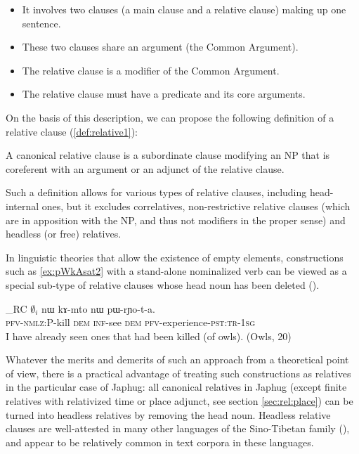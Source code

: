 \documentclass[oldfontcommands,oneside,a4paper,11pt]{article}
\newcommand{\ipa}[1]{{\phon #1}} %
\newcommand{\topic}{\textsc{dem}}
\begin{document}
\begin{itemize}
\item It involves two clauses (a main clause and a relative clause) making up one sentence. 
\item These two clauses share an argument (the Common Argument). 
\item The relative clause is a modifier of the Common Argument. 
\item The relative clause must have a predicate and its core arguments. 
\end{itemize}

On the basis of this description, we can propose  the following definition of a relative clause (\ref{def:relative1}):

\begin{exe}
\ex \label{def:relative1}
\glt A canonical relative clause is  a subordinate clause modifying an NP    that is coreferent with an argument or an adjunct of the relative clause. 
\end{exe}
 
Such a definition allows for various types of relative clauses, including head-internal ones, but it excludes correlatives, non-restrictive relative clauses (which are in apposition with the NP, and thus not modifiers in the proper sense) and headless (or free) relatives.

In linguistic theories that  allow the existence of empty elements, constructions such as \ref{ex:pWkAsat2} with a stand-alone nominalized verb can be viewed as a special sub-type of relative clauses whose head noun has been deleted (\citealt[197-205]{dryer07noun.phrase}). 


   \begin{exe}
\ex \label{ex:pWkAsat2}
\gll [$\emptyset_i$ \ipa{pɯ-kɤ-sat}]_{RC}  $\emptyset_i$ 	\ipa{nɯ}  	\ipa{kɤ-mto}  	\ipa{nɯ}  	\ipa{pɯ-rɲo-t-a.}  \\
{ }  \textsc{pfv-nmlz:P}-kill { } \topic{} \textsc{inf}-see \topic{} \textsc{pfv}-experience-\textsc{pst:tr-1sg} \\
\glt I have already seen ones that had been killed (of owls). (Owls, 20)
  \end{exe}

Whatever the merits and demerits of such an approach from a theoretical point of view, there is a practical advantage of treating such constructions as relatives in the particular case of Japhug: all canonical relatives in Japhug (except  finite relatives with relativized time or place adjunct, see section \ref{sec:rel:place}) can be turned into headless relatives by removing the head noun. Headless relative clauses are well-attested in many other languages of the Sino-Tibetan family (\citealt[128-9]{genetti08nmlz}), and appear to be relatively common in text corpora in these languages.
\end{document}
